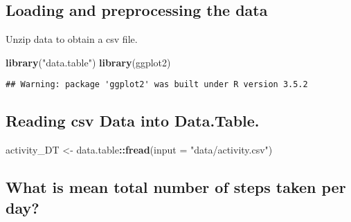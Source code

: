\documentclass[]{article}
\newenvironment{Shaded}{\begin{snugshade}}{\end{snugshade}}
\newcommand{\KeywordTok}[1]{\textcolor[rgb]{0.13,0.29,0.53}{\textbf{#1}}}
\newcommand{\DataTypeTok}[1]{\textcolor[rgb]{0.13,0.29,0.53}{#1}}
\newcommand{\StringTok}[1]{\textcolor[rgb]{0.31,0.60,0.02}{#1}}
\newcommand{\OperatorTok}[1]{\textcolor[rgb]{0.81,0.36,0.00}{\textbf{#1}}}
\newcommand{\NormalTok}[1]{#1}
\begin{document}
\subsection{Loading and preprocessing the
data}\label{loading-and-preprocessing-the-data}

Unzip data to obtain a csv file.

\begin{Shaded}
\begin{Highlighting}[]
\KeywordTok{library}\NormalTok{(}\StringTok{"data.table"}\NormalTok{)}
\KeywordTok{library}\NormalTok{(ggplot2)}
\end{Highlighting}
\end{Shaded}

\begin{verbatim}
## Warning: package 'ggplot2' was built under R version 3.5.2
\end{verbatim}

\begin{Shaded}
\end{Shaded}

\subsection{Reading csv Data into
Data.Table.}\label{reading-csv-data-into-data.table.}

\begin{Shaded}
\begin{Highlighting}[]
\NormalTok{activity_DT <-}\StringTok{ }\NormalTok{data.table}\OperatorTok{::}\KeywordTok{fread}\NormalTok{(}\DataTypeTok{input =} \StringTok{"data/activity.csv"}\NormalTok{)}
\end{Highlighting}
\end{Shaded}

\subsection{What is mean total number of steps taken per
day?}\label{what-is-mean-total-number-of-steps-taken-per-day}
\end{document}
